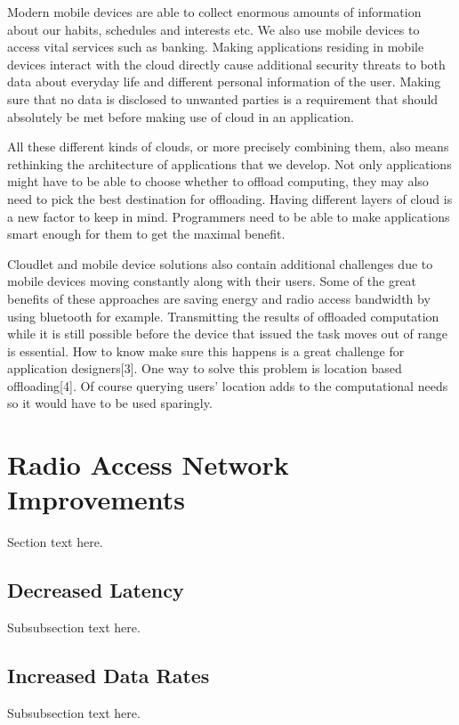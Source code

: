 \documentclass[conference]{IEEEtran}
\begin{document}
\par
Modern mobile devices are able to collect enormous amounts of information about our habits, schedules and interests etc. We also use mobile devices to access vital services such as banking. Making applications residing in mobile devices interact with the cloud directly cause additional security threats to both data about everyday life and different personal information of the user. Making sure that no data is disclosed to unwanted parties is a requirement that should absolutely be met before making use of cloud in an application.
\par
All these different kinds of clouds, or more precisely combining them, also means rethinking the architecture of applications that we develop. Not only applications might have to be able to choose whether to offload computing, they may also need to pick the best destination for offloading. Having different layers of cloud is a new factor to keep in mind. Programmers need to be able to make applications smart enough for them to get the maximal benefit.
\par
Cloudlet and mobile device solutions also contain additional challenges due to mobile devices moving constantly along with their users. Some of the great benefits of these approaches are saving energy and radio access bandwidth by using bluetooth for example. Transmitting the results of offloaded computation while it is still possible before the device that issued the task moves out of range is essential. How to know make sure this happens is a great challenge for application designers[3]. One way to solve this problem is location based offloading[4]. Of course querying users' location adds to the computational needs so it would have to be used sparingly.

\section{Radio Access Network Improvements}
Section text here.

\subsection{Decreased Latency}
Subsubsection text here.

\subsection{Increased Data Rates}
Subsubsection text here.
\end{document}
